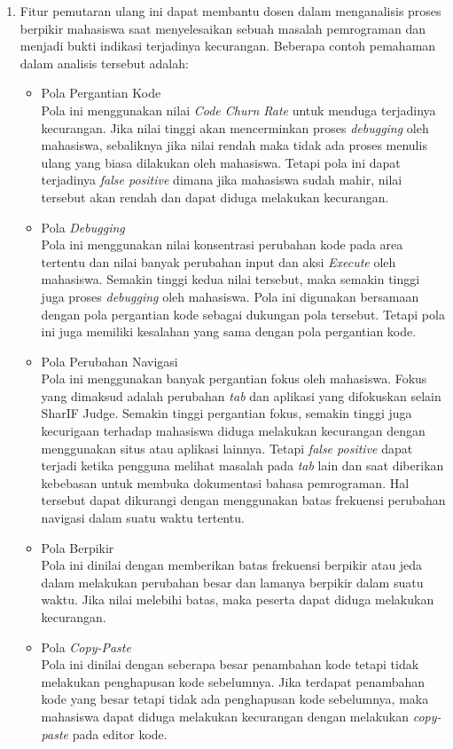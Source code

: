 \begin{enumerate}
	\item Fitur pemutaran ulang ini dapat membantu dosen dalam menganalisis proses berpikir mahasiswa saat menyelesaikan sebuah masalah pemrograman dan menjadi bukti indikasi terjadinya kecurangan. Beberapa contoh pemahaman dalam analisis tersebut adalah:
	\begin{itemize}
		\item Pola Pergantian Kode \\
		Pola ini menggunakan nilai \textit{Code Churn Rate} untuk menduga terjadinya kecurangan. Jika nilai tinggi akan mencerminkan proses \textit{debugging} oleh mahasiswa, sebaliknya jika nilai rendah maka tidak ada proses menulis ulang yang biasa dilakukan oleh mahasiswa. Tetapi pola ini dapat terjadinya \textit{false positive} dimana jika mahasiswa sudah mahir, nilai tersebut akan rendah dan dapat diduga melakukan kecurangan.
		\item Pola \textit{Debugging} \\
		Pola ini menggunakan nilai konsentrasi perubahan kode pada area tertentu dan nilai banyak perubahan input dan aksi \textit{Execute} oleh mahasiswa. Semakin tinggi kedua nilai tersebut, maka semakin tinggi juga proses \textit{debugging} oleh mahasiswa. Pola ini digunakan bersamaan dengan pola pergantian kode sebagai dukungan pola tersebut. Tetapi pola ini juga memiliki kesalahan yang sama dengan pola pergantian kode.
		\item Pola Perubahan Navigasi \\
		Pola ini menggunakan banyak pergantian fokus oleh mahasiswa. Fokus yang dimaksud adalah perubahan \textit{tab} dan aplikasi yang difokuskan selain SharIF Judge. Semakin tinggi pergantian fokus, semakin tinggi juga kecurigaan terhadap mahasiswa diduga melakukan kecurangan dengan menggunakan situs atau aplikasi lainnya. Tetapi \textit{false positive} dapat terjadi ketika pengguna melihat masalah pada \textit{tab} lain dan saat diberikan kebebasan untuk membuka dokumentasi bahasa pemrograman. Hal tersebut dapat dikurangi dengan menggunakan batas frekuensi perubahan navigasi dalam suatu waktu tertentu.
		\item Pola Berpikir \\
		Pola ini dinilai dengan memberikan batas frekuensi berpikir atau jeda dalam melakukan perubahan besar dan lamanya berpikir dalam suatu waktu. Jika nilai melebihi batas, maka peserta dapat diduga melakukan kecurangan.
		\item Pola \textit{Copy-Paste} \\
		Pola ini dinilai dengan seberapa besar penambahan kode tetapi tidak melakukan penghapusan kode sebelumnya. Jika terdapat penambahan kode yang besar tetapi tidak ada penghapusan kode sebelumnya, maka mahasiswa dapat diduga melakukan kecurangan dengan melakukan \textit{copy-paste} pada editor kode.
	\end{itemize}


\end{enumerate}
